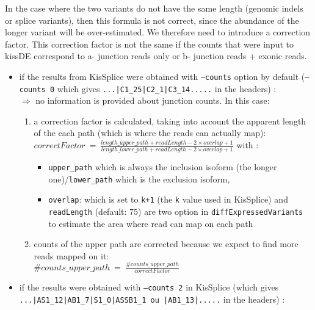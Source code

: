 \documentclass[english, a4paper, 12pt]{article}
\begin{document}
In the case where the two variants do not have the same length (genomic indels or splice variants), then this formula is not correct, since the abundance of the longer variant will be over-estimated. We therefore need to introduce a correction factor.
This correction factor is not the same if the counts that were input to kissDE correspond to a- junction reads only or b- junction reads + exonic reads.
\begin{itemize}
 \item if the results from KisSplice were obtained with \texttt{--counts} option by default (\texttt{--counts 0} which gives \texttt{...|C1\_25|C2\_1|C3\_14.....} in the headers) :\\
  $\Rightarrow$ no information is provided about junction counts. In this case:
 \begin{enumerate}
 \item a correction factor is calculated, taking into account the apparent length of the each path (which is where the reads can actually map):\\
   $correctFactor\:=\: \frac{length\_upper\_path + readLength - 2 \times overlap + 1}{length\_lower\_path + readLength - 2\times overlap + 1}$ with :
 \begin{itemize}
  \item \texttt{upper\_path} which is always the inclusion isoform (the longer one)/\texttt{lower\_path} which is the exclusion isoform,
  \item \texttt{overlap}: which is set to \texttt{k+1} (the \texttt{k} value used in KisSplice) and \texttt{readLength} (default: 75) are two option in \texttt{diffExpressedVariants} to estimate the area where read can map on each path
   \end{itemize}
            \item counts of the upper path are corrected because we expect to find more reads mapped on it:\\
            $\#counts\_upper\_path \:=\:  \frac{\#counts\_upper\_path}{correctFactor} $
 \end{enumerate}
 \item if the results were obtained with \texttt{--counts 2} in KisSplice (which gives \texttt{...|AS1\_12|AB1\_7|S1\_0|ASSB1\_1 ou |AB1\_13|.....} in the headers) :\\

\end{itemize}
\end{document}
